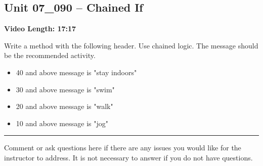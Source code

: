 \documentclass[letterpaper,12pt]{exam}
\newcommand{\unit}{Unit 07}
\begin{document}
\begin{questions}
\section*{\unit\_090 -- Chained If} %
\noindent \textbf{Video Length: 17:17}

\begin{samepage}
    \question Write a method with the following header.  Use chained logic.  The message should be the recommended activity.
      \begin{itemize} 
        \item 40 and above message is "stay indoors"
        \item 30 and above message is "swim"
        \item 20 and above message is "walk"
        \item 10 and above message is "jog"
        \vspace{5mm}
        
       \end{itemize}
\end{samepage}

\begin{samepage}
    \begin{center}
    \rule{0.8\textwidth}{.4pt}
    \end{center}
	\question Comment or ask questions here if there are any issues you would like for the instructor to address.  It is not necessary to answer if you do not have questions.
	\vspace{30mm}
\end{samepage}

\end{questions}
\end{document}

